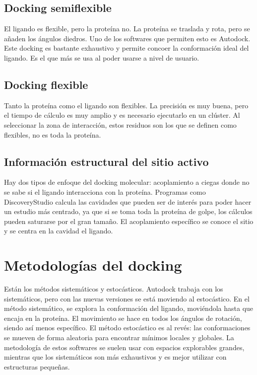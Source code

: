 \subsection{Docking semiflexible}
El ligando es flexible, pero la proteína no. La proteína se traslada y rota, pero se añaden los ángulos diedros. Uno de los softwares que permiten esto es Autodock. Este docking es bastante exhaustivo y permite concoer la conformación ideal del ligando. Es el que más se usa al poder usarse a nivel de usuario.

\subsection{Docking flexible}
Tanto la proteína como el ligando son flexibles. La precisión es muy buena, pero el tiempo de cálculo es muy amplio y es necesario ejecutarlo en un clúster. Al seleccionar la zona de interacción, estos residuos son los que se definen como flexibles, no es toda la proteína. 

\subsection{Información estructural del sitio activo}
Hay dos tipos de enfoque del docking molecular: acoplamiento a ciegas donde no se sabe si el ligando interacciona con la proteína. Programas como DiscoveryStudio calcula las cavidades que pueden ser de interés para poder hacer un estudio más centrado, ya que si se toma toda la proteína de golpe, los cálculos pueden saturarse por el gran tamaño. El acoplamiento específico se conoce el sitio y se centra en la cavidad el ligando. 

\section{Metodologías del docking}
Están los métodos sistemáticos y estocásticos. Autodock trabaja con los sistemáticos, pero con las nuevas versiones se está moviendo al estocástico. En el método sistemático, se explora la conformación del ligando, moviéndola hasta que encaja en la proteína. El movimiento se hace en todos los ángulos de rotación, siendo así menos específico. El método estocástico es al revés: las conformaciones se mueven de forma aleatoria para encontrar mínimos locales y globales. La metodología de estos softwares se suelen usar con espacios explorables grandes, mientras que los sistemáticos son más exhaustivos y es mejor utilizar con estructuras pequeñas. 

